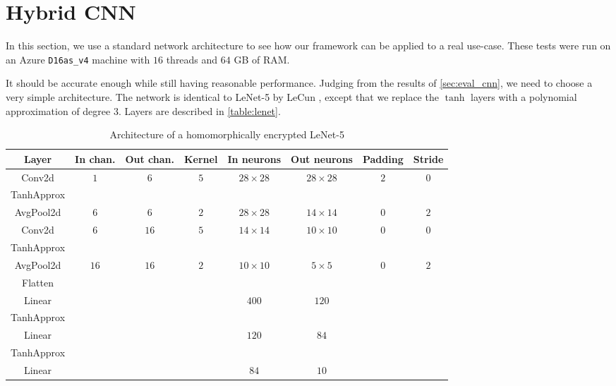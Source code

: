 \documentclass[a4paper,11pt,oneside]{report}
\begin{document}
\section{Hybrid CNN}

In this section, we use a standard network architecture to see how our framework can be applied to a real use-case. 
These tests were run on an Azure \texttt{D16as\_v4} machine with $16$ threads and $64$ GB of RAM.

It should be accurate enough while still having reasonable performance.
Judging from the results of \autoref{sec:eval_cnn}, we need to choose a very simple architecture. 
The network is identical to LeNet-5 by LeCun \cite{lecun_gradient-based_1998}, except that we replace the $\tanh$ layers with a polynomial approximation of degree $3$. 
Layers are described in \autoref{table:lenet}.

\begin{table}[h!]
  \begin{center}
    \caption{Architecture of a homomorphically encrypted LeNet-5}
    \label{table:lenet}
    \begin{tabular}{ c c c c c c c c }
    \hline
    Layer & In chan. & Out chan. & Kernel & In neurons & Out neurons & Padding & Stride \\
    \hline
    Conv2d & $1$ & $6$ & $5$ & $28 \times 28$ & $28 \times 28$ & $2$ & $0$ \\
    TanhApprox & & & & & & &  \\
    AvgPool2d & $6$ & $6$ & $2$ & $28 \times 28$ & $14 \times 14$ & $0$ & $2$ \\
    Conv2d & $6$ & $16$ & $5$ & $14 \times 14$ & $10 \times 10$ & $0$ & $0$ \\
    TanhApprox & & & & & & &  \\
    AvgPool2d & $16$ & $16$ & $2$ & $10 \times 10$ & $5 \times 5$ & $0$ & $2$ \\
    Flatten \\
    Linear & & & & $400$ & $120$ & &  \\
    TanhApprox & & & & & & &  \\
    Linear & & & & $120$ & $84$ & &  \\
    TanhApprox & & & & & & &  \\
    Linear & & & & $84$ & $10$ & &  \\
    \hline
    \end{tabular}
  \end{center}
\end{table}
\end{document}

